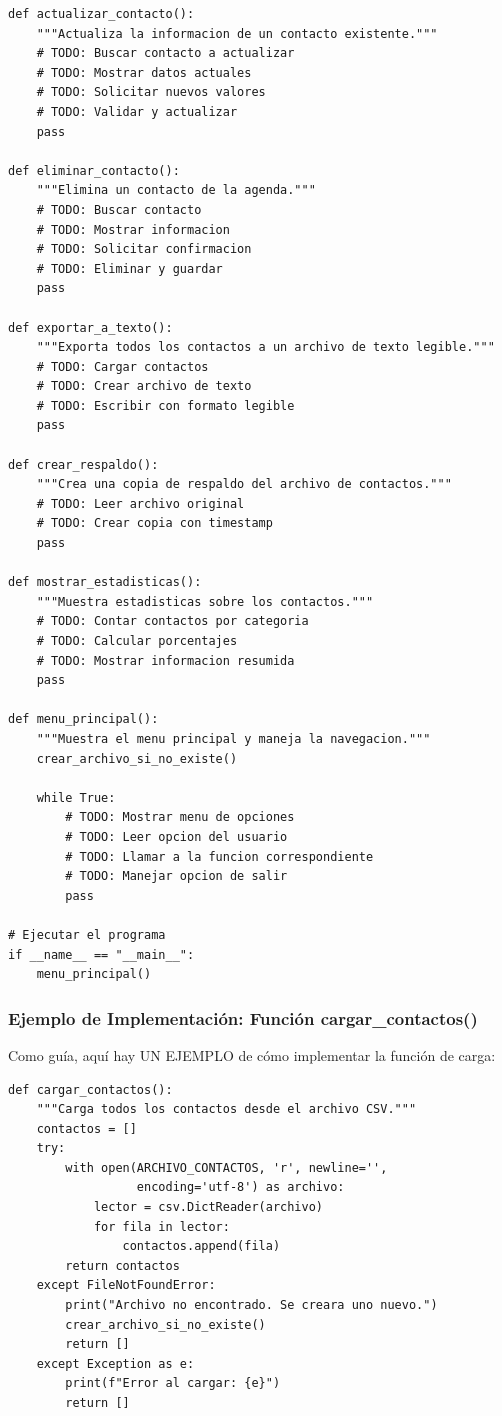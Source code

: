 \documentclass[11pt,letterpaper]{article}
\begin{document}
\begin{lstlisting}[caption={Plantilla básica del sistema}]
def actualizar_contacto():
    """Actualiza la informacion de un contacto existente."""
    # TODO: Buscar contacto a actualizar
    # TODO: Mostrar datos actuales
    # TODO: Solicitar nuevos valores
    # TODO: Validar y actualizar
    pass

def eliminar_contacto():
    """Elimina un contacto de la agenda."""
    # TODO: Buscar contacto
    # TODO: Mostrar informacion
    # TODO: Solicitar confirmacion
    # TODO: Eliminar y guardar
    pass

def exportar_a_texto():
    """Exporta todos los contactos a un archivo de texto legible."""
    # TODO: Cargar contactos
    # TODO: Crear archivo de texto
    # TODO: Escribir con formato legible
    pass

def crear_respaldo():
    """Crea una copia de respaldo del archivo de contactos."""
    # TODO: Leer archivo original
    # TODO: Crear copia con timestamp
    pass

def mostrar_estadisticas():
    """Muestra estadisticas sobre los contactos."""
    # TODO: Contar contactos por categoria
    # TODO: Calcular porcentajes
    # TODO: Mostrar informacion resumida
    pass

def menu_principal():
    """Muestra el menu principal y maneja la navegacion."""
    crear_archivo_si_no_existe()
    
    while True:
        # TODO: Mostrar menu de opciones
        # TODO: Leer opcion del usuario
        # TODO: Llamar a la funcion correspondiente
        # TODO: Manejar opcion de salir
        pass

# Ejecutar el programa
if __name__ == "__main__":
    menu_principal()
\end{lstlisting}

\subsubsection{Ejemplo de Implementación: Función cargar\_contactos()}

Como guía, aquí hay UN EJEMPLO de cómo implementar la función de carga:

\begin{lstlisting}[caption={Ejemplo: Implementación de cargar\_contactos}]
def cargar_contactos():
    """Carga todos los contactos desde el archivo CSV."""
    contactos = []
    try:
        with open(ARCHIVO_CONTACTOS, 'r', newline='', 
                  encoding='utf-8') as archivo:
            lector = csv.DictReader(archivo)
            for fila in lector:
                contactos.append(fila)
        return contactos
    except FileNotFoundError:
        print("Archivo no encontrado. Se creara uno nuevo.")
        crear_archivo_si_no_existe()
        return []
    except Exception as e:
        print(f"Error al cargar: {e}")
        return []
\end{lstlisting}
\end{document}
